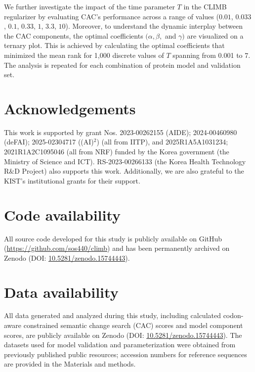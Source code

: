 \documentclass[pdflatex,sn-nature]{sn-jnl}
\begin{document}
We further investigate the impact of the time parameter $T$ in the CLIMB regularizer by evaluating CAC's performance across a range of values ($0.01$, $0.033$, $0.1$, $0.33$, $1$, $3.3$, $10$).
Moreover,
to understand the dynamic interplay between the CAC components,
the optimal coefficients $(\alpha, \beta,$ and $ \gamma)$ are visualized on a ternary plot.
This is achieved by calculating the optimal coefficients that minimized the mean rank for 1,000 discrete values of $T$ spanning from 0.001 to 7.
The analysis is repeated for each combination of protein model and validation set.


\section*{Acknowledgements}
This work is supported by grant Nos.
2023-00262155 (AIDE); 2024-00460980 (deFAI); 2025-02304717 ((AI)$^2$) (all from IITP), and
2025R1A5A1031234; 2021R1A2C1095046 (all from NRF)
funded by the Korea government (the Ministry of Science and ICT).
RS-2023-00266133 (the Korea Health Technology R$\&$D Project) also supports this work.
Additionally, we are also grateful to the KIST's institutional grants for their support.

\section*{Code availability}
All source code developed for this study is publicly available on GitHub (\url{https://github.com/sos440/climb}) and has been permanently archived on Zenodo (DOI: \href{https://doi.org/10.5281/zenodo.15744443}{10.5281/zenodo.15744443}).

\section*{Data availability}
All data generated and analyzed during this study, including calculated codon-aware constrained semantic change search (CAC) scores and model component scores, are publicly available on Zenodo (DOI: \href{https://doi.org/10.5281/zenodo.15744443}{10.5281/zenodo.15744443}). The datasets used for model validation and parameterization were obtained from previously published public resources; accession numbers for reference sequences are provided in the Materials and methods.
\end{document}
